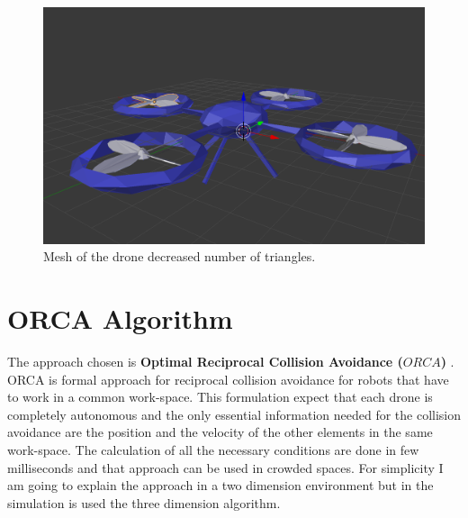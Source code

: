 \documentclass[11pt,twocolumn]{article}
\begin{document}
\begin{figure}
\centering
\includegraphics[scale=0.12]{droneSimple.png}
\caption{Mesh of the drone decreased number of triangles. }
\label{fig:2}
\end{figure}

\section{ORCA Algorithm}
\label{sec:collision avoidance}
The approach chosen is \textbf{Optimal Reciprocal Collision Avoidance ($\mathit{ORCA}$)} \cite{DBLP:conf/dars/Alonso-MoraBRBS10}.
ORCA is formal approach for reciprocal collision avoidance for robots that have to work in a common work-space. This formulation expect that each drone is completely autonomous and the only essential information needed for the collision avoidance are the position and the velocity of the other elements in the same work-space. The calculation of all the necessary conditions are done in few milliseconds and that approach can be used in crowded spaces. For simplicity I am going to explain the approach in a two dimension environment but in the simulation is used the three dimension algorithm.
\end{document}
